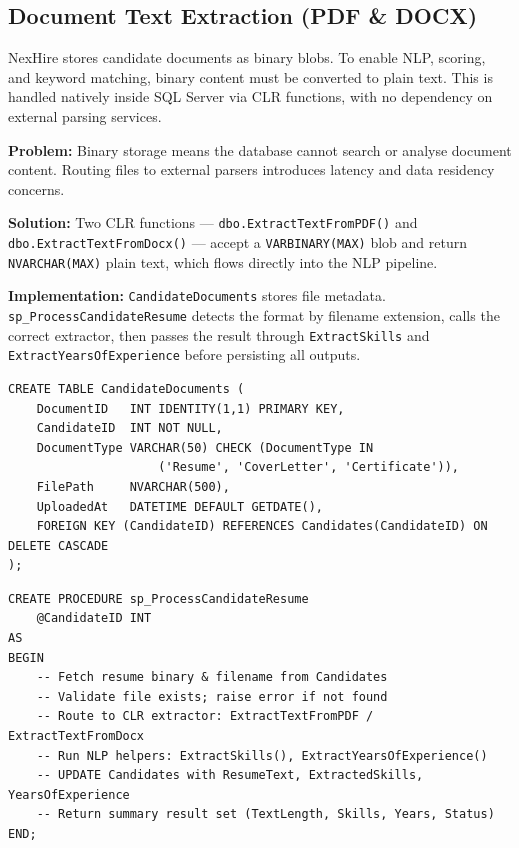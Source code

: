 \documentclass[11pt,a4paper]{article}
\begin{document}
\newpage

\subsection{Document Text Extraction (PDF \& DOCX)}

\noindent
NexHire stores candidate documents as binary blobs. To enable NLP, scoring, and keyword matching, binary content must be converted to plain text. This is handled natively inside SQL Server via CLR functions, with no dependency on external parsing services.

\textbf{Problem:} Binary storage means the database cannot search or analyse document content. Routing files to external parsers introduces latency and data residency concerns.

\textbf{Solution:} Two CLR functions --- \texttt{dbo.ExtractTextFromPDF()} and \texttt{dbo.ExtractTextFromDocx()} --- accept a \texttt{VARBINARY(MAX)} blob and return \texttt{NVARCHAR(MAX)} plain text, which flows directly into the NLP pipeline.

\textbf{Implementation:} \texttt{CandidateDocuments} stores file metadata. \texttt{sp\_ProcessCandidateResume} detects the format by filename extension, calls the correct extractor, then passes the result through \texttt{ExtractSkills} and \texttt{ExtractYearsOfExperience} before persisting all outputs.

\begin{verbatim}
CREATE TABLE CandidateDocuments (
    DocumentID   INT IDENTITY(1,1) PRIMARY KEY,
    CandidateID  INT NOT NULL,
    DocumentType VARCHAR(50) CHECK (DocumentType IN
                     ('Resume', 'CoverLetter', 'Certificate')),
    FilePath     NVARCHAR(500),
    UploadedAt   DATETIME DEFAULT GETDATE(),
    FOREIGN KEY (CandidateID) REFERENCES Candidates(CandidateID) ON DELETE CASCADE
);
\end{verbatim}

\begin{verbatim}
CREATE PROCEDURE sp_ProcessCandidateResume
    @CandidateID INT
AS
BEGIN
    -- Fetch resume binary & filename from Candidates
    -- Validate file exists; raise error if not found
    -- Route to CLR extractor: ExtractTextFromPDF / ExtractTextFromDocx
    -- Run NLP helpers: ExtractSkills(), ExtractYearsOfExperience()
    -- UPDATE Candidates with ResumeText, ExtractedSkills, YearsOfExperience
    -- Return summary result set (TextLength, Skills, Years, Status)
END;
\end{verbatim}
\end{document}
